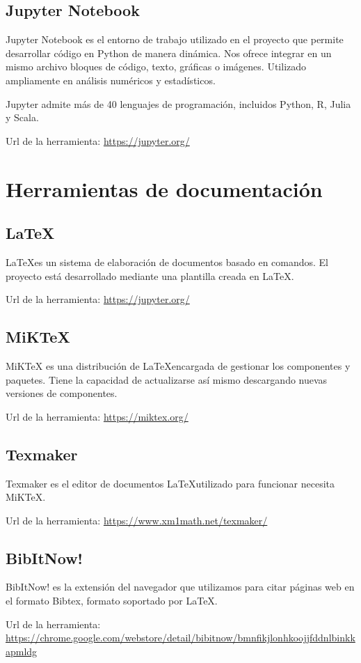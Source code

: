 \subsection{Jupyter Notebook}
Jupyter Notebook es el entorno de trabajo utilizado en el proyecto que permite desarrollar código en Python de manera dinámica. Nos ofrece integrar en un mismo archivo bloques de código, texto, gráficas o imágenes. Utilizado ampliamente en análisis numéricos y estadísticos.

Jupyter admite más de 40 lenguajes de programación, incluidos Python, R, Julia y Scala.

Url de la herramienta: \url{https://jupyter.org/}

\section{Herramientas de documentación}
\subsection{\LaTeX}
\LaTeX es un sistema de elaboración de documentos basado en comandos. El proyecto está desarrollado mediante una plantilla creada en \LaTeX.

Url de la herramienta: \url{https://jupyter.org/}

\subsection{MiKTeX}
MiKTeX es una distribución de \LaTeX encargada de gestionar los componentes y paquetes. Tiene la capacidad de actualizarse así mismo descargando nuevas versiones de componentes.

Url de la herramienta: \url{https://miktex.org/}

\subsection{Texmaker}
Texmaker es el editor de documentos \LaTeX utilizado para funcionar necesita MiKTeX.

Url de la herramienta: \url{https://www.xm1math.net/texmaker/}

\subsection{BibItNow!}
BibItNow! es la extensión del navegador que utilizamos para citar páginas web en el formato Bibtex, formato soportado por \LaTeX.

Url de la herramienta: \url{https://chrome.google.com/webstore/detail/bibitnow/bmnfikjlonhkoojjfddnlbinkkapmldg}

